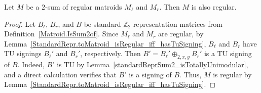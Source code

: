 \begin{theorem}
    \label{Matroid.IsSum2of.isRegular}
    \leanok
    Let $M$ be a $2$-sum of regular matroids $M_{\ell}$ and $M_{r}$. Then $M$ is also regular.
\end{theorem}

\begin{proof}
    \leanok
    Let $B_{\ell}$, $B_{r}$, and $B$ be standard $\mathbb{Z}_{2}$ representation matrices from Definition~\ref{Matroid.IsSum2of}. Since $M_{\ell}$ and $M_{r}$ are regular, by Lemma~\ref{StandardRepr.toMatroid_isRegular_iff_hasTuSigning}, $B_{\ell}$ and $B_{r}$ have TU signings $B_{\ell}'$ and $B_{r}'$, respectively. Then $B' = B_{\ell}' \oplus_{2, x, y} B_{r}'$ is a TU signing of $B$. Indeed, $B'$ is TU by Lemma~\ref{standardReprSum2_isTotallyUnimodular}, and a direct calculation verifies that $B'$ is a signing of $B$. Thus, $M$ is regular by Lemma~\ref{StandardRepr.toMatroid_isRegular_iff_hasTuSigning}.
\end{proof}
